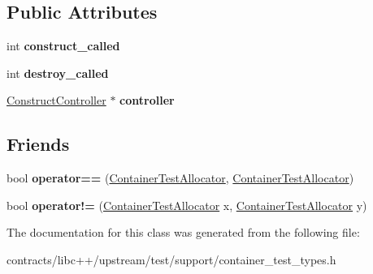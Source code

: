 \subsection*{Public Attributes}
\begin{DoxyCompactItemize}
\item 
\mbox{\label{class_container_test_allocator_ae728343576d440142c5b3f81709e1869}} 
int {\bfseries construct\+\_\+called}
\item 
\mbox{\label{class_container_test_allocator_ac7f5518fc72d8ad25686133280f9e5b8}} 
int {\bfseries destroy\+\_\+called}
\item 
\mbox{\label{class_container_test_allocator_a77bdad4aa104c84009399fef8e66ebc4}} 
\mbox{\hyperlink{struct_allocator_construct_controller}{Construct\+Controller}} $\ast$ {\bfseries controller}
\end{DoxyCompactItemize}
\subsection*{Friends}
\begin{DoxyCompactItemize}
\item 
\mbox{\label{class_container_test_allocator_aa980e4eb9683adacbcc3ca23e2a1450f}} 
bool {\bfseries operator==} (\mbox{\hyperlink{class_container_test_allocator}{Container\+Test\+Allocator}}, \mbox{\hyperlink{class_container_test_allocator}{Container\+Test\+Allocator}})
\item 
\mbox{\label{class_container_test_allocator_a99bbf6d75d4e7b2246eee69275c15a99}} 
bool {\bfseries operator!=} (\mbox{\hyperlink{class_container_test_allocator}{Container\+Test\+Allocator}} x, \mbox{\hyperlink{class_container_test_allocator}{Container\+Test\+Allocator}} y)
\end{DoxyCompactItemize}


The documentation for this class was generated from the following file\+:\begin{DoxyCompactItemize}
\item 
contracts/libc++/upstream/test/support/container\+\_\+test\+\_\+types.\+h\end{DoxyCompactItemize}
